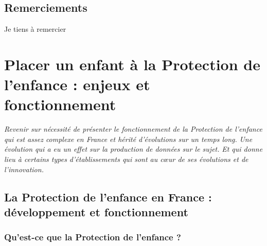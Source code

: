 \documentclass[
  12,
  a4paper,
]{report}
\begin{document}

{}
\section*{Remerciements}

Je tiens à remercier

\vspace{.5cm}

\newpage

\newpage
\begin{spacing}{1}
{}

\tableofcontents
\listoftables
\listoffigures

\end{spacing}

\newpage
{}
\setlength{\parskip}{1em}

\newpage

\hypertarget{placer-un-enfant-uxe0-la-protection-de-lenfance-enjeux-et-fonctionnement}{%
\chapter{Placer un enfant à la Protection de l'enfance : enjeux et
fonctionnement}\label{placer-un-enfant-uxe0-la-protection-de-lenfance-enjeux-et-fonctionnement}}

\emph{Revenir sur nécessité de présenter le fonctionnement de la
Protection de l'enfance qui est assez complexe en France et hérité
d'évolutions sur un temps long.} \emph{Une évolution qui a eu un effet
sur la production de données sur le sujet.} \emph{Et qui donne lieu à
certains types d'établissements qui sont au cœur de ses évolutions et de
l'innovation.}

\hypertarget{la-protection-de-lenfance-en-france-duxe9veloppement-et-fonctionnement}{%
\section{La Protection de l'enfance en France : développement et
fonctionnement}\label{la-protection-de-lenfance-en-france-duxe9veloppement-et-fonctionnement}}

\hypertarget{quest-ce-que-la-protection-de-lenfance}{%
\subsection{Qu'est-ce que la Protection de l'enfance
?}\label{quest-ce-que-la-protection-de-lenfance}}
\end{document}
